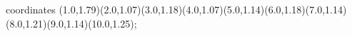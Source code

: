 					coordinates { (1.0,1.79)(2.0,1.07)(3.0,1.18)(4.0,1.07)(5.0,1.14)(6.0,1.18)(7.0,1.14)(8.0,1.21)(9.0,1.14)(10.0,1.25)};